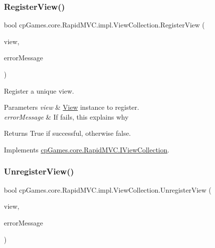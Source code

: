 \mbox{\label{classcp_games_1_1core_1_1_rapid_m_v_c_1_1impl_1_1_view_collection_a654222e061d5dc730992cbc0aa519205}} 
\subsubsection{\texorpdfstring{RegisterView()}{RegisterView()}}
{\footnotesize\ttfamily bool cp\+Games.\+core.\+Rapid\+M\+V\+C.\+impl.\+View\+Collection.\+Register\+View (\begin{DoxyParamCaption}\item[{\mbox{\hyperlink{interfacecp_games_1_1core_1_1_rapid_m_v_c_1_1_i_view}{I\+View}}}]{view,  }\item[{out string}]{error\+Message }\end{DoxyParamCaption})}



Register a unique view. 


\begin{DoxyParams}{Parameters}
{\em view} & \mbox{\hyperlink{classcp_games_1_1core_1_1_rapid_m_v_c_1_1_view}{View}} instance to register.\\
\hline
{\em error\+Message} & If fails, this explains why\\
\hline
\end{DoxyParams}
\begin{DoxyReturn}{Returns}
True if successful, otherwise false.
\end{DoxyReturn}


Implements \mbox{\hyperlink{interfacecp_games_1_1core_1_1_rapid_m_v_c_1_1_i_view_collection_aba8465ad92ed63a4ad210c60d50cfc56}{cp\+Games.\+core.\+Rapid\+M\+V\+C.\+I\+View\+Collection}}.

\mbox{\label{classcp_games_1_1core_1_1_rapid_m_v_c_1_1impl_1_1_view_collection_a5a88bea4fa82d3422364a2e6ba81e1ca}} 
\subsubsection{\texorpdfstring{UnregisterView()}{UnregisterView()}}
{\footnotesize\ttfamily bool cp\+Games.\+core.\+Rapid\+M\+V\+C.\+impl.\+View\+Collection.\+Unregister\+View (\begin{DoxyParamCaption}\item[{\mbox{\hyperlink{interfacecp_games_1_1core_1_1_rapid_m_v_c_1_1_i_view}{I\+View}}}]{view,  }\item[{out string}]{error\+Message }\end{DoxyParamCaption})}



